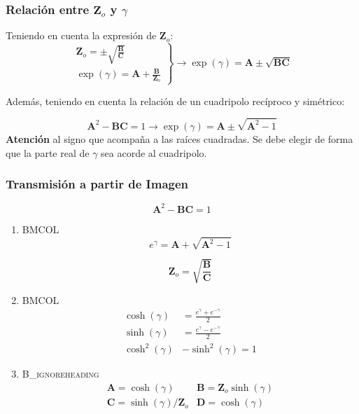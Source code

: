 \subsubsection{Relación entre \(\mathbf{Z}_o\) y \(\gamma\)}
\label{sec:org2783cff}

Teniendo en cuenta la expresión de \(\mathbf{Z}_o\):
\[
  \left.
  \begin{array}{l}
    \mathbf{Z}_o = \pm \sqrt{\frac{\mathbf{B}}{\mathbf{C}}}\\
    \exp(\gamma) = \mathbf{A} + \frac{\mathbf{B}}{\mathbf{Z}_o}
  \end{array} \right\} \rightarrow
\boxed{\exp(\gamma) = \mathbf{A} \pm \sqrt{\mathbf{B}\mathbf{C}}}
\]

Además, teniendo en cuenta la relación de un cuadripolo recíproco y simétrico:

\[
  \mathbf{A}^2 - \mathbf{B}\mathbf{C} = 1 \rightarrow %
  \boxed{\exp(\gamma) = \mathbf{A} \pm \sqrt{\mathbf{A}^2 - 1}}
\]
\textbf{Atención} al signo que acompaña a las raíces cuadradas. Se debe elegir de forma que la parte real de \(\gamma\) sea acorde al cuadripolo.

\subsubsection{Transmisión a partir de Imagen}
\label{sec:org593cab5}

\[
\mathbf{A}^2 - \mathbf{B}\mathbf{C} = 1
\]

\begin{enumerate}
\item \hfill{}\textsc{BMCOL}
\label{sec:orgbfdda51}
\[
  e^\gamma = \mathbf{A} + \sqrt{\mathbf{A}^2 - 1}
\]

\[
  \mathbf{Z}_o = \sqrt{\frac{\mathbf{B}}{\mathbf{C}}}
\]

\item \hfill{}\textsc{BMCOL}
\label{sec:orgbb55298}
\begin{align*}
  \cosh(\gamma) &= \frac{e^\gamma + e^{-\gamma}}{2}\\
  \sinh(\gamma) &= \frac{e^\gamma - e^{-\gamma}}{2}\\
  \cosh^2(\gamma) &- \sinh^2(\gamma) = 1
\end{align*}

\item \hfill{}\textsc{B\_ignoreheading}
\label{sec:org51374bf}
\[
\boxed{
  \begin{array}{ll}
    \mathbf{A} = \cosh(\gamma) &
    \mathbf{B} = \mathbf{Z}_o \sinh(\gamma)\\
    \mathbf{C} = \sinh(\gamma)/\mathbf{Z}_o &
    \mathbf{D} = \cosh(\gamma)\\
  \end{array}
}
\]
\end{enumerate}

